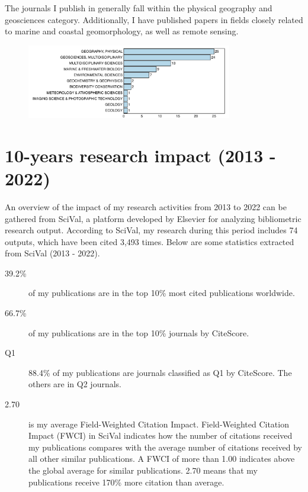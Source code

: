 \documentclass[11pt]{article}
\begin{document}
{\normalfont The journals I publish in generally fall within the physical geography and geosciences category. Additionally, I have published papers in fields closely related to marine and coastal geomorphology, as well as remote sensing.}

\begin{figure}[h]
\centering
\includegraphics[width=0.8\textwidth]{img/topics.pdf}
\end{figure}

\section{10-years research impact (2013 - 2022)}
\bigskip

{\normalfont An overview of the impact of my research activities from 2013 to 2022 can be gathered from SciVal, a platform developed by Elsevier for analyzing bibliometric research output. According to SciVal, my research during this period includes 74 outputs, which have been cited 3,493 times. Below are some statistics extracted from SciVal (2013 - 2022).}
\smallskip

{\footnotesize 
\begin{description}
  \item [39.2\%] of my publications are in the top 10\% most cited publications worldwide.
  \item [66.7\%] of my publications are in the top 10\% journals by CiteScore.
  \item [Q1] 88.4\% of my publications are journals classified as Q1 by CiteScore. The others are in Q2 journals.
  \item [2.70] is my average Field-Weighted Citation Impact. Field-Weighted Citation Impact (FWCI) in SciVal indicates how the number of citations received my publications compares with the average number of citations received by all other similar publications. A FWCI of more than 1.00 indicates above the global average for similar publications. 2.70 means that my publications receive 170\% more citation than average.
\end{description}}
\end{document}
